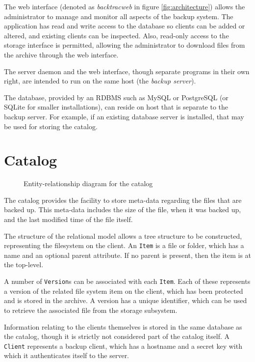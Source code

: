 The web interface (denoted as \emph{backtracweb} in figure
\ref{fig:architecture}) allows the administrator to manage and monitor all
aspects of the backup system. The application has read and write access to the
database so clients can be added or altered, and existing clients can be
inspected. Also, read-only access to the storage interface is permitted,
allowing the administrator to download files from the archive through the web
interface.

The server daemon and the web interface, though separate programs in their own
right, are intended to run on the same host (the \emph{backup server}).

The database, provided by an RDBMS such as MySQL or PostgreSQL (or SQLite for
smaller installations), can reside on host that is separate to the backup
server. For example, if an existing database server is installed, that may be
used for storing the catalog.

\section{Catalog}

\begin{figure}
    \begin{center}
        
    \end{center}
    \caption{Entity-relationship diagram for the catalog}
    \label{fig:erd}
\end{figure}

The catalog provides the facility to store meta-data regarding the files that
are backed up. This meta-data includes the size of the file, when it was backed
up, and the last modified time of the file itself.

The structure of the relational model allows a tree structure to be
constructed, representing the filesystem on the client. An \verb!Item! is
a file or folder, which has a name and an optional parent attribute. If no
parent is present, then the item is at the top-level.

A number of \verb!Version!s can be associated with each \verb!Item!. Each of
these represents a version of the related file system item on the client, which
has been protected and is stored in the archive. A version has a unique
identifier, which can be used to retrieve the associated file from the storage
subsystem.

Information relating to the clients themselves is stored in the same database
as the catalog, though it is strictly not considered part of the catalog
itself. A \verb!Client! represents a backup client, which has a hostname and
a secret key with which it authenticates itself to the server.

